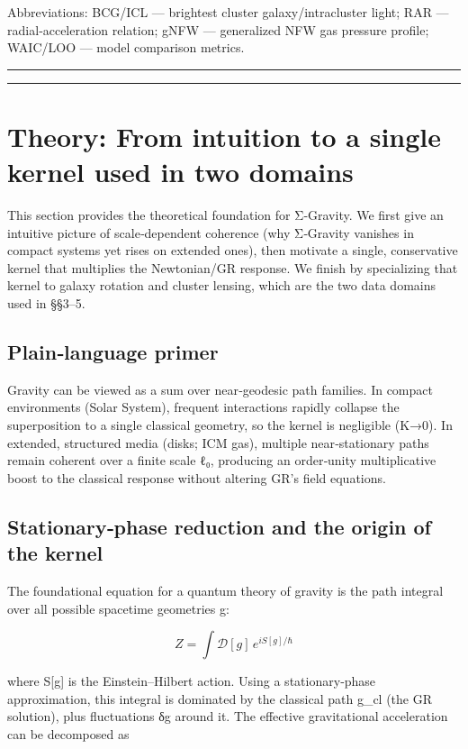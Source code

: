\documentclass[11pt,a4paper]{article}
\begin{document}
Abbreviations: BCG/ICL — brightest cluster galaxy/intracluster light; RAR — radial‑acceleration relation; gNFW — generalized NFW gas pressure profile; WAIC/LOO — model comparison metrics.


\medskip\hrule\medskip

\medskip\hrule\medskip


\section{Theory: From intuition to a single kernel used in two domains}


This section provides the theoretical foundation for Σ‑Gravity. We first give an intuitive picture of scale‑dependent coherence (why Σ‑Gravity vanishes in compact systems yet rises on extended ones), then motivate a single, conservative kernel that multiplies the Newtonian/GR response. We finish by specializing that kernel to galaxy rotation and cluster lensing, which are the two data domains used in §§3–5.


\subsection{Plain‑language primer}


Gravity can be viewed as a sum over near‑geodesic path families. In compact environments (Solar System), frequent interactions rapidly collapse the superposition to a single classical geometry, so the kernel is negligible (K→0). In extended, structured media (disks; ICM gas), multiple near‑stationary paths remain coherent over a finite scale ℓ₀, producing an order‑unity multiplicative boost to the classical response without altering GR’s field equations.


\subsection{Stationary‑phase reduction and the origin of the kernel}


The foundational equation for a quantum theory of gravity is the path integral over all possible spacetime geometries g:


\begin{equation}
Z = \int \mathcal{D}[g] \, e^{iS[g]/\hbar}
\end{equation}


where S[g] is the Einstein–Hilbert action. Using a stationary‑phase approximation, this integral is dominated by the classical path g\_cl (the GR solution), plus fluctuations δg around it. The effective gravitational acceleration can be decomposed as
\end{document}
